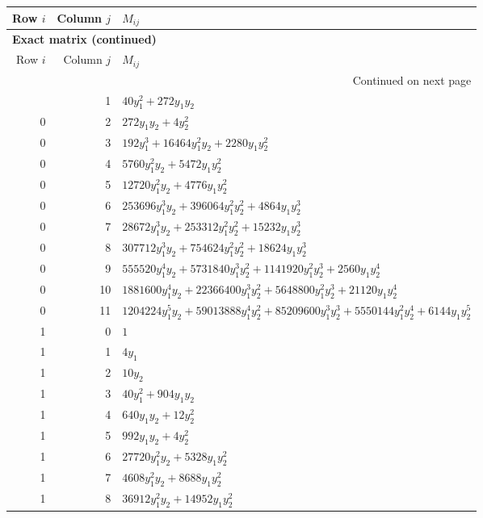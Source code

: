 \documentclass[10pt,a4paper]{article}
\begin{document}
{\small\setlength{\tabcolsep}{7pt}\begin{longtable}{rrp{125mm}}
\toprule Row $i$ & Column $j$ & $M_{ij}$\\\midrule\endfirsthead
\multicolumn{3}{l}{\textbf{Exact matrix (continued)}}\\
\toprule Row $i$ & Column $j$ & $M_{ij}$\\\midrule\endhead
\midrule\multicolumn{3}{r}{Continued on next page}\\\endfoot\bottomrule\endlastfoot
0 & 1 & $40 y_{1}^{2} + 272 y_{1} y_{2}$\\
0 & 2 & $272 y_{1} y_{2} + 4 y_{2}^{2}$\\
0 & 3 & $192 y_{1}^{3} + 16464 y_{1}^{2} y_{2} + 2280 y_{1} y_{2}^{2}$\\
0 & 4 & $5760 y_{1}^{2} y_{2} + 5472 y_{1} y_{2}^{2}$\\
0 & 5 & $12720 y_{1}^{2} y_{2} + 4776 y_{1} y_{2}^{2}$\\
0 & 6 & $253696 y_{1}^{3} y_{2} + 396064 y_{1}^{2} y_{2}^{2} + 4864 y_{1} y_{2}^{3}$\\
0 & 7 & $28672 y_{1}^{3} y_{2} + 253312 y_{1}^{2} y_{2}^{2} + 15232 y_{1} y_{2}^{3}$\\
0 & 8 & $307712 y_{1}^{3} y_{2} + 754624 y_{1}^{2} y_{2}^{2} + 18624 y_{1} y_{2}^{3}$\\
0 & 9 & $555520 y_{1}^{4} y_{2} + 5731840 y_{1}^{3} y_{2}^{2} + 1141920 y_{1}^{2} y_{2}^{3} + 2560 y_{1} y_{2}^{4}$\\
0 & 10 & $1881600 y_{1}^{4} y_{2} + 22366400 y_{1}^{3} y_{2}^{2} + 5648800 y_{1}^{2} y_{2}^{3} + 21120 y_{1} y_{2}^{4}$\\
0 & 11 & $1204224 y_{1}^{5} y_{2} + 59013888 y_{1}^{4} y_{2}^{2} + 85209600 y_{1}^{3} y_{2}^{3} + 5550144 y_{1}^{2} y_{2}^{4} + 6144 y_{1} y_{2}^{5}$\\
1 & 0 & $1$\\
1 & 1 & $4 y_{1}$\\
1 & 2 & $10 y_{2}$\\
1 & 3 & $40 y_{1}^{2} + 904 y_{1} y_{2}$\\
1 & 4 & $640 y_{1} y_{2} + 12 y_{2}^{2}$\\
1 & 5 & $992 y_{1} y_{2} + 4 y_{2}^{2}$\\
1 & 6 & $27720 y_{1}^{2} y_{2} + 5328 y_{1} y_{2}^{2}$\\
1 & 7 & $4608 y_{1}^{2} y_{2} + 8688 y_{1} y_{2}^{2}$\\
1 & 8 & $36912 y_{1}^{2} y_{2} + 14952 y_{1} y_{2}^{2}$\\

\end{longtable}}
\end{document}

